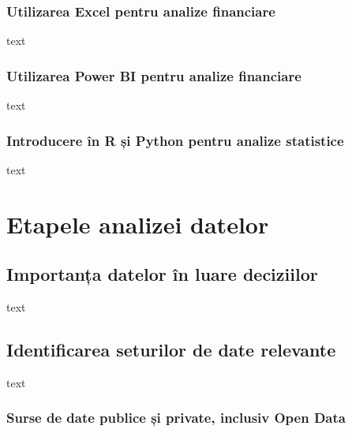 \documentclass[
  11pt,
  b5paper,
  nottoc]{book}
\begin{document}
\hypertarget{utilizarea-excel-pentru-analize-financiare-3}{%
\subsection{Utilizarea Excel pentru analize
financiare}\label{utilizarea-excel-pentru-analize-financiare-3}}

text

\hypertarget{utilizarea-power-bi-pentru-analize-financiare-3}{%
\subsection{Utilizarea Power BI pentru analize
financiare}\label{utilizarea-power-bi-pentru-analize-financiare-3}}

text

\hypertarget{introducere-uxeen-r-ux219i-python-pentru-analize-statistice-3}{%
\subsection{Introducere în R și Python pentru analize
statistice}\label{introducere-uxeen-r-ux219i-python-pentru-analize-statistice-3}}

text


\hypertarget{cap5}{%
\chapter{Etapele analizei datelor}\label{cap5}}

\hypertarget{importanux21ba-datelor-uxeen-luare-deciziilor-4}{%
\section{Importanța datelor în luare
deciziilor}\label{importanux21ba-datelor-uxeen-luare-deciziilor-4}}

text

\hypertarget{identificarea-seturilor-de-date-relevante-4}{%
\section{Identificarea seturilor de date
relevante}\label{identificarea-seturilor-de-date-relevante-4}}

text

\hypertarget{surse-de-date-publice-ux219i-private-inclusiv-open-data-4}{%
\subsection{Surse de date publice și private, inclusiv Open
Data}\label{surse-de-date-publice-ux219i-private-inclusiv-open-data-4}}
\end{document}
